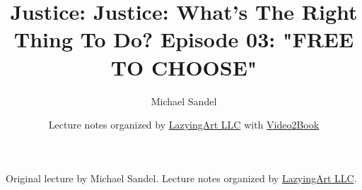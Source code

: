 \documentclass[11pt,oneside]{book}
\begin{document}
\frontmatter
\title{Justice: Justice: What's The Right Thing To Do? Episode 03: "FREE TO CHOOSE"}
\author{Michael Sandel}
\date{Lecture notes organized by \href{https://lazying.art}{LazyingArt LLC} with \href{https://github.com/lachlanchen/Video2Book}{Video2Book}}
\maketitle
\begin{center}
\small Original lecture by Michael Sandel. Lecture notes organized by \href{https://lazying.art}{LazyingArt LLC}.
\end{center}
\clearpage
\mainmatter

\end{document}
